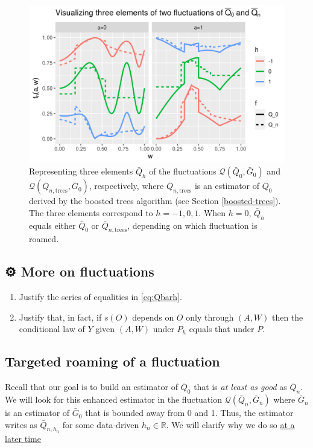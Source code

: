 \documentclass[11pt,openright,twoside]{book}
\newcommand{\gear}{\usebox{\gearbox}\;}
\newcommand{\bbR}{\mathbb{R}}
\newcommand{\calQ}{\mathcal{Q}}
\newcommand{\Gbar}{\bar{G}}
\newcommand{\Qbar}{\bar{Q}}
\theoremstyle{definition}
\theoremstyle{definition}
\theoremstyle{definition}
\theoremstyle{remark}
\begin{document}
\begin{figure}

{\centering \includegraphics[width=0.7\linewidth]{img/fluctuation-1} 

}

\caption{Representing three elements \(\Qbar_{h}\) of the fluctuations \(\calQ(\Qbar_{0}, \Gbar_{0})\) and \(\calQ(\Qbar_{n,\text{trees}}, \Gbar_{0})\), respectively, where \(\Qbar_{n,\text{trees}}\) is an estimator of \(\Qbar_{0}\) derived by the boosted trees algorithm (see Section \ref{boosted-trees}). The three elements correspond to \(h=-1,0,1\). When \(h=0\), \(\Qbar_{h}\) equals either \(\Qbar_{0}\) or \(\Qbar_{n,\text{trees}}\), depending on which fluctuation is roamed.}\label{fig:fluctuation}
\end{figure}

\hypertarget{exo-fluct}{%
\subsection{\texorpdfstring{⚙ \gear More on fluctuations}{⚙ More on fluctuations}}\label{exo-fluct}}

\begin{enumerate}
\def\labelenumi{\arabic{enumi}.}
\item
  Justify the series of equalities in \eqref{eq:Qbarh}.
\item
  Justify that, in fact, if \(s(O)\) depends on \(O\) only through \((A,W)\) then
  the conditional law of \(Y\) given \((A,W)\) under \(P_{h}\) equals that under
  \(P\).
\end{enumerate}

\hypertarget{roaming}{%
\subsection{Targeted roaming of a fluctuation}\label{roaming}}

Recall that our goal is to build an estimator of \(\Qbar_0\) that is \emph{at least
as good} as \(\Qbar_n\). We will look for this enhanced estimator in the
fluctuation \(\calQ(\Qbar_{n}, \Gbar_{n})\) where \(\Gbar_{n}\) is an estimator of
\(\Gbar_{0}\) that is bounded away from 0 and 1. Thus, the estimator writes as
\(\Qbar_{n,h_{n}}\) for some data-driven \(h_{n} \in \bbR\). We will clarify why
we do so \protect\hyperlink{fluct-justification}{at a later time}
\end{document}
